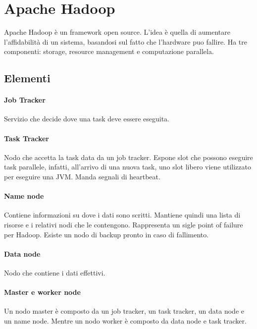\section{Apache Hadoop}
Apache Hadoop è un framework open source. L'idea è quella di aumentare l'affidabilità di un sistema, basandosi sul fatto che l'hardware puo fallire.
Ha tre componenti: storage, resource management e computazione parallela.

\subsection{Elementi}

\paragraph{Job Tracker}
Servizio che decide dove una task deve essere eseguita.

\paragraph{Task Tracker}
Nodo che accetta la task data da un job tracker. Espone slot che possono eseguire
task parallele, infatti, all'arrivo di una nuova task, uno slot libero viene utilizzato per eseguire una JVM. Manda segnali di heartbeat.

\paragraph{Name node}
Contiene informazioni su dove i dati sono scritti. Mantiene quindi una lista 
di risorse e i relativi nodi che le contengono. Rappresenta un sigle point of failure
per Hadoop. Esiste un nodo di backup pronto in caso di fallimento.

\paragraph{Data node}
Nodo che contiene i dati effettivi.

\paragraph{Master e worker node}
Un nodo master è composto da un job tracker, un task tracker, un data node e un name node. Mentre un nodo worker è composto da data node e task tracker.

